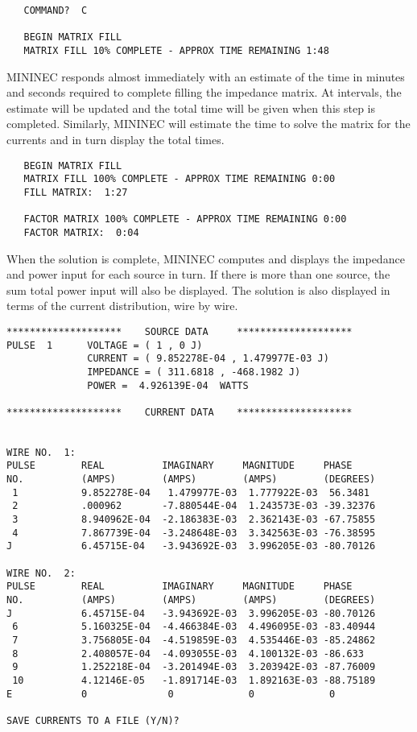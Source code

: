 \documentclass[12pt]{article}
\begin{document}
\begin{Verbatim}
   COMMAND?  C

   BEGIN MATRIX FILL
   MATRIX FILL 10% COMPLETE - APPROX TIME REMAINING 1:48
\end{Verbatim}

MININEC responds almost immediately with an estimate of the time in
minutes and seconds required to complete filling the impedance matrix.
At intervals, the estimate will be updated and the total time will be
given when this step is completed. Similarly, MININEC will estimate the
time to solve the matrix for the currents and in turn display the total
times.

\begin{Verbatim}
   BEGIN MATRIX FILL
   MATRIX FILL 100% COMPLETE - APPROX TIME REMAINING 0:00
   FILL MATRIX:  1:27

   FACTOR MATRIX 100% COMPLETE - APPROX TIME REMAINING 0:00
   FACTOR MATRIX:  0:04
\end{Verbatim}

When the solution is complete, MININEC computes and displays the
impedance and power input for each source in turn. If there is more than
one source, the sum total power input will also be displayed. The
solution is also displayed in terms of the current distribution, wire by
wire.

\begin{Verbatim}
********************    SOURCE DATA     ********************
PULSE  1      VOLTAGE = ( 1 , 0 J)
              CURRENT = ( 9.852278E-04 , 1.479977E-03 J)
              IMPEDANCE = ( 311.6818 , -468.1982 J)
              POWER =  4.926139E-04  WATTS

********************    CURRENT DATA    ********************


WIRE NO.  1:
PULSE        REAL          IMAGINARY     MAGNITUDE     PHASE
NO.          (AMPS)        (AMPS)        (AMPS)        (DEGREES)
 1           9.852278E-04   1.479977E-03  1.777922E-03  56.3481
 2           .000962       -7.880544E-04  1.243573E-03 -39.32376
 3           8.940962E-04  -2.186383E-03  2.362143E-03 -67.75855
 4           7.867739E-04  -3.248648E-03  3.342563E-03 -76.38595
J            6.45715E-04   -3.943692E-03  3.996205E-03 -80.70126

WIRE NO.  2:
PULSE        REAL          IMAGINARY     MAGNITUDE     PHASE
NO.          (AMPS)        (AMPS)        (AMPS)        (DEGREES)
J            6.45715E-04   -3.943692E-03  3.996205E-03 -80.70126
 6           5.160325E-04  -4.466384E-03  4.496095E-03 -83.40944
 7           3.756805E-04  -4.519859E-03  4.535446E-03 -85.24862
 8           2.408057E-04  -4.093055E-03  4.100132E-03 -86.633
 9           1.252218E-04  -3.201494E-03  3.203942E-03 -87.76009
 10          4.12146E-05   -1.891714E-03  1.892163E-03 -88.75189
E            0              0             0             0

SAVE CURRENTS TO A FILE (Y/N)?
\end{Verbatim}
\end{document}
